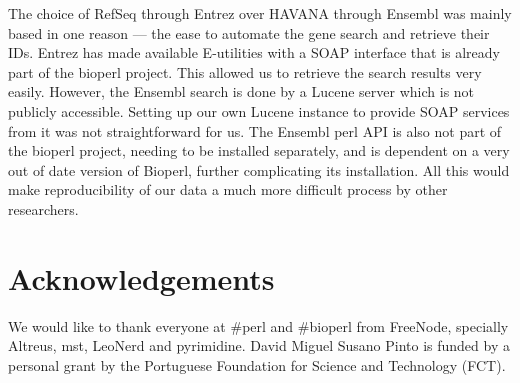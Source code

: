 \documentclass[10pt,a4paper,draft]{article}
\begin{document}
    The choice of RefSeq through Entrez over HAVANA through Ensembl was mainly based in one reason --- the ease
    to automate the gene search and retrieve their IDs. Entrez has made available E-utilities with a SOAP interface
    that is already part of the bioperl project. This allowed us to retrieve the search results very easily.
    However, the Ensembl search is done by a Lucene server which is not publicly accessible. Setting up our own
    Lucene instance to provide SOAP services from it was not straightforward for us. The Ensembl perl API is
    also not part of the bioperl project, needing to be installed separately, and is dependent on a very
    out of date version of Bioperl, further complicating its installation. All this would make reproducibility
    of our data a much more difficult process by other researchers.

  \section{Acknowledgements}
    We would like to thank everyone at #perl and #bioperl from FreeNode, specially Altreus, mst, LeoNerd and pyrimidine. David Miguel
    Susano Pinto is funded by a personal grant by the Portuguese Foundation for Science and Technology (FCT).
\end{document}
